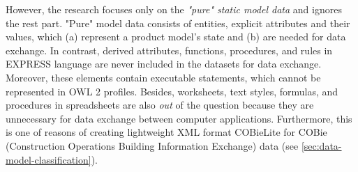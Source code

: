 However, the research focuses only on the \emph{"pu\-re" sta\-tic mod\-el da\-ta} and ignores the rest part.
"Pure" model data consists of entities, explicit attributes and their values, which (a) represent a product model's state and (b) are needed for data exchange. 
In contrast, derived attributes, functions, procedures, and rules in EXPRESS language are never included in the datasets for data exchange.
Moreover, these elements contain executable statements, which cannot be represented in OWL 2 profiles.
Besides, worksheets, text styles, formulas, and procedures in spreadsheets are also \emph{out} of the question because they are unnecessary for data exchange between computer applications.
Furthermore, this is one of reasons of creating lightweight XML format COBieLite for COBie (Construction Operations Building Information Exchange) data (see \autoref{sec:data-model-classification}).




